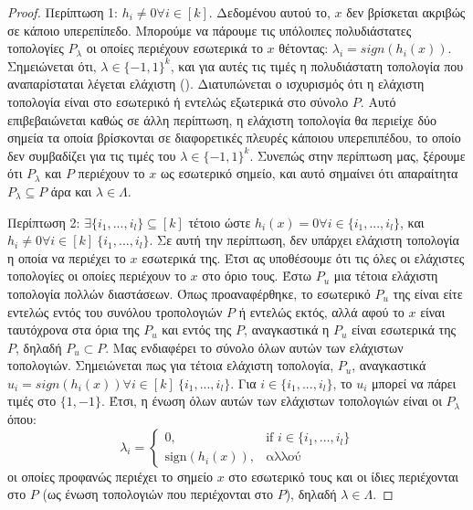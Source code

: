 \begin{appendices}
\begin{proof}
        Περίπτωση 1: \(h_{i} \neq 0 \forall i \in [k]\). Δεδομένου αυτού το, $x$ δεν βρίσκεται ακριβώς σε κάποιο υπερεπίπεδο. Μπορούμε να πάρουμε τις υπόλοιπες πολυδιάστατες τοπολογίες \(P_{\lambda}\) οι οποίες περιέχουν εσωτερικά το \(x\) θέτοντας: \(\lambda_{i} = sign(h_{i}(x))\). Σημειώνεται ότι, \(\lambda \in \{-1,1\}^{k}\), και για αυτές τις τιμές η πολυδιάστατη τοπολογία που αναπαρίσταται λέγεται ελάχιστη (). Διατυπώνεται ο ισχυρισμός ότι η ελάχιστη τοπολογία είναι στο εσωτερικό ή εντελώς εξωτερικά στο σύνολο \(P\). Αυτό επιβεβαιώνεται καθώς σε άλλη περίπτωση, η ελάχιστη τοπολογία θα περιείχε δύο σημεία τα οποία βρίσκονται σε διαφορετικές πλευρές κάποιου υπερεπιπέδου, το οποίο δεν συμβαδίζει για τις τιμές του $\lambda \in \{-1, 1\}^k$. Συνεπώς στην περίπτωση μας, ξέρουμε ότι $P_{\lambda}$  και $P$ περιέχουν το $x$ ως εσωτερικό σημείο, και αυτό σημαίνει ότι απαραίτητα $P_{\lambda} \subseteq P$ άρα και $\lambda \in \Lambda$.

        Περίπτωση 2: \( \exists \{i_1,...,i_l\} \subseteq [k]\) τέτοιο ώστε \(h_{i}(x) = 0 \forall i \in  \{i_1,...,i_l\}\), και $h_i \neq 0 \forall i \in [k] \ \{i_1,...,i_l\}$. Σε αυτή την περίπτωση, δεν υπάρχει ελάχιστη τοπολογία η οποία να περιέχει το $x$ εσωτερικά της. Έτσι ας υποθέσουμε ότι τις όλες οι ελάχιστες τοπολογίες οι οποίες περιέχουν το $x$  στο όριο τους. Έστω \(P_{u}\) μια τέτοια ελάχιστη τοπολογία πολλών διαστάσεων. Όπως προαναφέρθηκε, το εσωτερικό \(P_{u}\) της είναι είτε εντελώς εντός του συνόλου τροπολογιών \(P\) ή εντελώς εκτός, αλλά αφού το \(x\) είναι ταυτόχρονα στα όρια της \(P_{u}\) και εντός της \(P\), αναγκαστικά η \(P_{u}\) είναι εσωτερικά της \(P\), δηλαδή \(P_{u} \subset P\). Μας ενδιαφέρει το σύνολο όλων αυτών των ελάχιστων τοπολογιών. Σημειώνεται πως για τέτοια ελάχιστη τοπολογία, \(P_{u}\), αναγκαστικά $u_{i} = sign(h_i(x)) \forall i  \in [k] \ \{i_1,...,i_l\} $. Για \(i \in \{i_1,...,i_l\}\), το \(u_i\) μπορεί να πάρει τιμές στο \( \{1, -1\} \). Έτσι, η ένωση όλων αυτών των ελάχιστων τοπολογιών είναι οι \(P_{\lambda}\) όπου:\[\lambda_i =
                        \begin{cases}
                        0, & \text{if } i \in \{i_1, \ldots, i_l\} \\
                        \text{sign}(h_i(x)), & \text{αλλού}
                        \end{cases}
                    \]
        οι οποίες προφανώς περιέχει το σημείο $x$ στο εσωτερικό τους και οι ίδιες περιέχονται στο \(P\) (ως ένωση τοπολογιών που περιέχονται στο \(P\)), δηλαδή \(\lambda \in \Lambda\).


\end{proof}
\end{appendices}
